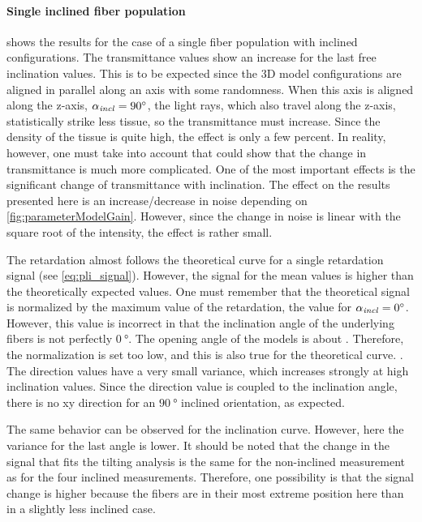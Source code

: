 \paragraph{Single inclined fiber population}
 shows the results for the case of a single fiber population with inclined configurations.
The transmittance values show an increase for the last free inclination values.
This is to be expected since the 3D model configurations are aligned in parallel along an axis with some randomness.
When this axis is aligned along the z-axis, \ie{} $\textnormal{$\alpha_{\mathit{incl}}$}=\SI{90}{\degree}$, the light rays, which also travel along the z-axis, statistically strike less tissue, so the transmittance must increase.
Since the density of the tissue is quite high, the effect is only a few percent.
In reality, however, one must take into account that \cite{Menzel2021} could show that the change in transmittance is much more complicated.
One of the most important effects is the significant change of transmittance with inclination.
The effect on the results presented here is an increase/decrease in noise depending on \cref{fig:parameterModelGain}.
However, since the change in noise is linear with the square root of the intensity, the effect is rather small.
\par
%
The retardation almost follows the theoretical curve for a single retardation signal (see \cref{eq:pli_signal}).
However, the signal for the mean values is higher than the theoretically expected values.
One must remember that the theoretical signal is normalized by the maximum value of the retardation, \ie{} the value for $\textnormal{$\alpha_{\mathit{incl}}$} = \SI{0}{\degree}$.
However, this value is incorrect in that the inclination angle of the underlying fibers is not perfectly $\SI{0}{\degree}$. The opening angle of the models is about \dummy{}.
Therefore, the normalization is set too low, and this is also true for the theoretical curve.
\dummy{}.
%
The direction values have a very small variance, which increases strongly at high inclination values.
Since the direction value is coupled to the inclination angle, there is no xy direction for an $\SI{90}{\degree}$ inclined orientation, as expected.
\par
%
The same behavior can be observed for the inclination curve.
However, here the variance for the last angle is lower.
It should be noted that the change in the signal that fits the tilting analysis is the same for the non-inclined measurement as for the four inclined measurements.
Therefore, one possibility is that the signal change is higher because the fibers are in their most extreme position here than in a slightly less inclined case.
